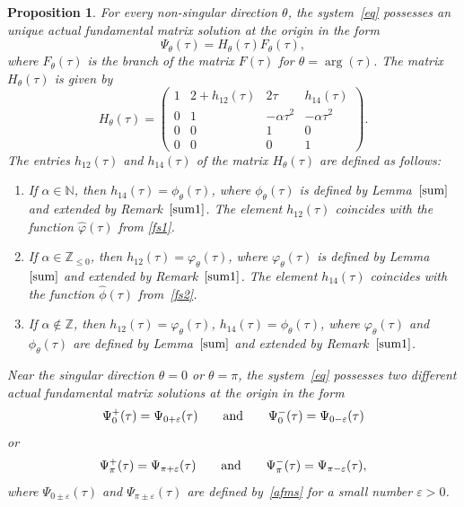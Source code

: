 \documentclass[10pt,a4paper]{amsart}
\numberwithin{equation}{section}
\newtheorem{Proposition}[Theorem]{Proposition}
 { \theoremstyle{definition}
\newtheorem{Definition}[Theorem]{Definition}
\newtheorem{Note}[Theorem]{Note}
\newtheorem{Example}[Theorem]{Example}
\newtheorem{Remark}[Theorem]{Remark} }
\begin{document}
 \begin{Proposition}\label{ac}
 For every non-singular direction $\theta$, the system~\eqref{eq} possesses an unique actual fundamental matrix solution
 at the origin in the form
 \begin{equation}
 \Psi_{\theta}(\tau)=H_{\theta}(\tau) F_{\theta}(\tau) ,\label{afms}
 \end{equation}
 where $F_{\theta}(\tau)$ is the branch of the matrix $F(\tau)$ for $\theta=\arg (\tau)$. The matrix $H_{\theta}(\tau)$
 is given by
 \[
 H_{\theta}(\tau)=\begin{pmatrix}
 1 & 2 + h_{12}(\tau) & 2 \tau & h_{14}(\tau)\\
 0 & 1 & -\alpha \tau^2 & -\alpha \tau^2\\
 0 & 0 & 1 & 0\\
 0 & 0 & 0 & 1
 \end{pmatrix} .
 \]
 The entries $h_{12}(\tau)$ and $h_{14}(\tau)$ of the matrix $H_{\theta}(\tau)$ are defined as follows:
 \begin{enumerate}
 	\itemsep=0pt
 \item[$1.$]
 If $\alpha\in\mathbb{N}$, then $h_{14}(\tau)=\phi_{\theta}(\tau)$, where $\phi_{\theta}(\tau)$ is defined by Lemma~$\ref{sum}$
 and extended by Remark~$\ref{sum1}$. The element $h_{12}(\tau)$ coincides with the function $\hat{\varphi}(\tau)$ from
 \eqref{fs1}.

 \item[$2.$]
 If $\alpha\in\mathbb{Z}_{\leq 0}$, then $h_{12}(\tau)=\varphi_{\theta}(\tau)$, where $\varphi_{\theta}(\tau)$ is defined
 by Lemma~$\ref{sum}$ and extended by Remark~$\ref{sum1}$. The element $h_{14}(\tau)$ coincides with the function $\hat{\phi}(\tau)$
 from~\eqref{fs2}.

 \item[$3.$]
 If $\alpha\notin\mathbb{Z}$, then $h_{12}(\tau)=\varphi_{\theta}(\tau)$, $h_{14}(\tau)=\phi_{\theta}(\tau)$,
 where $\varphi_{\theta}(\tau)$ and $\phi_{\theta}(\tau)$ are defined by Lemma~$\ref{sum}$ and extended by Remark~$\ref{sum1}$.
\end{enumerate}
 	
 Near the singular direction $\theta=0$ or $\theta=\pi$, the system~\eqref{eq} possesses two different actual
 fundamental matrix solutions at the origin in the form
 \[
 \Psi_{0}^+(\tau)=\Psi_{0+\varepsilon}(\tau) \qquad {\rm and} \qquad \Psi_0^{-}(\tau)=\Psi_{0-\varepsilon}(\tau)
 \] 	
 or
 \[
 \Psi_{\pi}^+(\tau)=\Psi_{\pi+\varepsilon}(\tau) \qquad {\rm and} \qquad \Psi_{\pi}^{-}(\tau)=\Psi_{\pi-\varepsilon}(\tau),
 \] 	
 where $\Psi_{0\pm \varepsilon}(\tau)$ and $\Psi_{\pi \pm \varepsilon}(\tau)$ are defined by~\eqref{afms} for a small number
 $\varepsilon > 0$.
 \end{Proposition}
\end{document}
